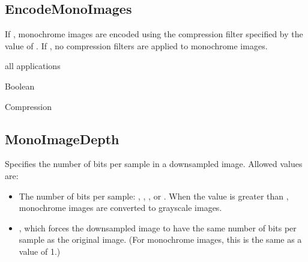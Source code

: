\documentclass[letterpaper,12pt,english,openany,oneside]{sphinxmanual}
\begin{document}
\label{\detokenize{PDF_Create_CommonSettings:default-value-52}}

\begin{sphinxVerbatim}[commandchars=\\\{\}]
\end{sphinxVerbatim}




\subsection{EncodeMonoImages}
\label{\detokenize{PDF_Create_CommonSettings:encodemonoimages}}
If  , monochrome images are encoded using the compression filter specified by the value of  . If  , no compression filters are applied to monochrome images.

\label{\detokenize{PDF_Create_CommonSettings:supported-by-57}}

all applications

\label{\detokenize{PDF_Create_CommonSettings:type-57}}

Boolean

\label{\detokenize{PDF_Create_CommonSettings:ui-name-43}}

Compression

\label{\detokenize{PDF_Create_CommonSettings:default-value-53}}

\begin{sphinxVerbatim}[commandchars=\\\{\}]
\end{sphinxVerbatim}




\subsection{MonoImageDepth}
\label{\detokenize{PDF_Create_CommonSettings:monoimagedepth}}
Specifies the number of bits per sample in a downsampled image. Allowed values are:
\begin{itemize}
\item {} 
The number of bits per sample:  ,  ,  , or  . When the value is greater than  , monochrome images are converted to grayscale images.

\item {} 
 , which forces the downsampled image to have the same number of bits per sample as the original image. (For monochrome images, this is the same as a value of 1.)

\end{itemize}
\end{document}
